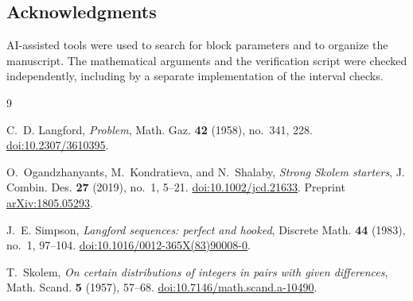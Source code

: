 \documentclass[11pt]{amsart}
\begin{document}
\subsection*{Acknowledgments}
AI-assisted tools were used to search for block parameters and
to organize the manuscript.
The mathematical arguments and the verification script were
checked independently, including by a separate implementation
of the interval checks.

\begin{thebibliography}{9}

C.~D. Langford, \emph{Problem},
Math. Gaz. \textbf{42} (1958), no.~341, 228.
\href{https://doi.org/10.2307/3610395}{doi:10.2307/3610395}.

O.~Ogandzhanyants, M.~Kondratieva, and N.~Shalaby,
\emph{Strong Skolem starters},
J. Combin. Des. \textbf{27} (2019), no.~1, 5--21.
\href{https://doi.org/10.1002/jcd.21633}{doi:10.1002/jcd.21633}.
Preprint \href{https://arxiv.org/abs/1805.05293}{arXiv:1805.05293}.

J.~E. Simpson, \emph{Langford sequences: perfect and hooked},
Discrete Math. \textbf{44} (1983), no.~1, 97--104.
\href{https://doi.org/10.1016/0012-365X(83)90008-0}
     {doi:10.1016/0012-365X(83)90008-0}.

T.~Skolem, \emph{On certain distributions of integers in pairs
with given differences}, Math. Scand. \textbf{5} (1957), 57--68.
\href{https://doi.org/10.7146/math.scand.a-10490}
     {doi:10.7146/math.scand.a-10490}.

\end{thebibliography}
\end{document}
